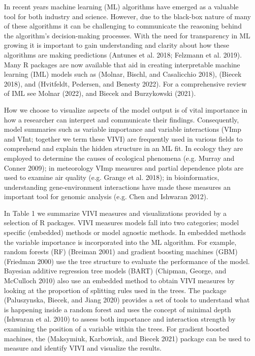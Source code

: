 In recent years machine learning (ML) algorithms have emerged as a
valuable tool for both industry and science. However, due to the
black-box nature of many of these algorithms it can be challenging to
communicate the reasoning behind the algorithm's decision-making
processes. With the need for transparency in ML growing it is important
to gain understanding and clarity about how these algorithms are making
predictions (Antunes et al. 2018; Felzmann et al. 2019). Many R
packages are now available that aid in creating interpretable machine
learning (IML) models such as  (Molnar, Bischl, and Casalicchio 2018),  (Biecek 2018), and
 (Hvitfeldt, Pedersen, and Benesty 2022). For a
comprehensive review of IML see Molnar (2022), and
Biecek and Burzykowski (2021).

How we choose to visualize aspects of the model output is of vital
importance in how a researcher can interpret and communicate their
findings. Consequently, model summaries such as variable importance and
variable interactions (VImp and VInt; together we term these VIVI) are
frequently used in various fields to comprehend and explain the hidden
structure in an ML fit. In ecology they are employed to determine the
causes of ecological phenomena (e.g. Murray and Conner 2009); in meteorology
VImp measures and partial dependence plots are used to examine air
quality (e.g. Grange et al. 2018); in bioinformatics, understanding
gene-environment interactions have made these measures an important tool
for genomic analysis (e.g. Chen and Ishwaran 2012).

In Table 1 we summarize VIVI measures and visualizations
provided by a selection of R packages. VIVI measures
models fall into two categories; model specific (embedded) methods or
model agnostic methods. In embedded methods the variable importance is
incorporated into the ML algorithm. For example, random forests (RF)
(Breiman 2001) and gradient boosting machines (GBM) (Friedman 2000) use the tree structure to evaluate the performance of the
model. Bayesian additive regression tree models (BART) (Chipman, George, and McCulloch 2010)
also use an embedded method to obtain VIVI measures by looking at the
proportion of splitting rules used in the trees. The package  (Paluszynska, Biecek, and Jiang 2020) provides
a set of tools to understand what is happening inside a random forest
and uses the concept of minimal depth (Ishwaran et al. 2010) to assess both importance and interaction
strength by examining the position of a variable within the trees. For
gradient boosted machines, the  (Maksymiuk, Karbowiak, and Biecek 2021) package can be used to
measure and identify VIVI and visualize the results.

